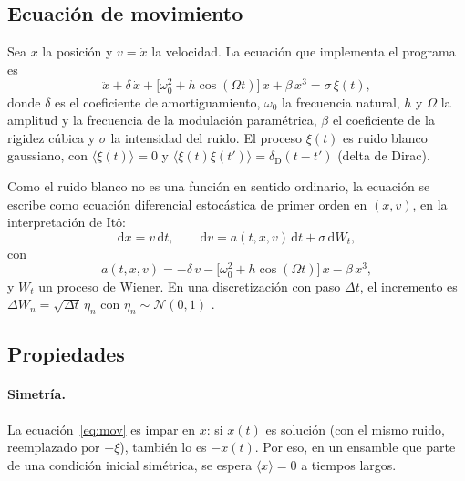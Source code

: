\documentclass[12pt,a4paper]{article}
\newcommand{\dd}{\mathrm{d}}
\newcommand{\media}[1]{\langle #1\rangle}
\begin{document}
\subsection{Ecuación de movimiento}

Sea $x$ la posición y $v=\dot x$ la velocidad. La ecuación que implementa el programa es
\begin{equation}
    \ddot x + \delta\,\dot x + \big[\omega_0^{2}+h\cos(\Omega t)\big]\,x + \beta\,x^{3} = \sigma\,\xi(t),
    \label{eq:mov}
\end{equation}
donde $\delta$ es el coeficiente de amortiguamiento, $\omega_0$ la frecuencia natural, $h$ y $\Omega$ la amplitud y la frecuencia de la modulación paramétrica, $\beta$ el coeficiente de la rigidez cúbica y $\sigma$ la intensidad del ruido. El proceso $\xi(t)$ es ruido blanco gaussiano, con $\media{\xi(t)}=0$ y $\media{\xi(t)\xi(t')}=\delta_{\mathrm{D}}(t-t')$ (delta de Dirac).

Como el ruido blanco no es una función en sentido ordinario, la ecuación se escribe como ecuación diferencial estocástica de primer orden en $(x,v)$, en la interpretación de Itô:
\begin{equation}
    \dd x = v\,\dd t, \qquad
    \dd v = a(t,x,v)\,\dd t + \sigma\,\dd W_t,
    \label{eq:sde}
\end{equation}
con
\begin{equation}
    a(t,x,v) = -\delta\,v - \big[\omega_0^{2}+h\cos(\Omega t)\big]\,x - \beta\,x^{3},
\end{equation}
y $W_t$ un proceso de Wiener. En una discretización con paso $\Delta t$, el incremento es $\Delta W_n=\sqrt{\Delta t}\,\eta_n$ con $\eta_n\sim\mathcal N(0,1)$ \cite{higham2001}.

\subsection{Propiedades}

\paragraph{Simetría.} La ecuación~\eqref{eq:mov} es impar en $x$: si $x(t)$ es solución (con el mismo ruido, reemplazado por $-\xi$), también lo es $-x(t)$. Por eso, en un ensamble que parte de una condición inicial simétrica, se espera $\media{x}=0$ a tiempos largos.
\end{document}
